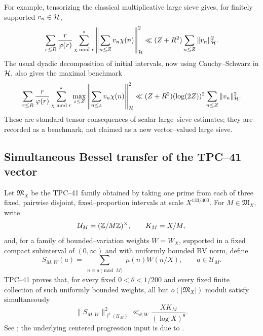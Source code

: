 For example, tensorizing the classical multiplicative large sieve
\citep{MontgomeryVaughan1973} gives, for finitely supported
\(v_n\in\mathcal H\),
\begin{equation}
 \sum_{r\le R}\frac r{\varphi(r)}
 \sum_{\chi\bmod r}^{*}
 \left\|\sum_{n\le Z}v_n\chi(n)\right\|_{\mathcal H}^{2}
 \ll (Z+R^2)\sum_{n\le Z}\|v_n\|_{\mathcal H}^{2}.
 \label{eq:tpc42-hilbert-multiplicative-large-sieve}
\end{equation}
The usual dyadic decomposition of initial intervals, now using
Cauchy--Schwarz in \(\mathcal H\), also gives the maximal benchmark
\begin{equation}
 \sum_{r\le R}\frac r{\varphi(r)}
 \sum_{\chi\bmod r}^{*}
 \max_{z\le Z}
 \left\|\sum_{n\le z}v_n\chi(n)\right\|_{\mathcal H}^{2}
 \ll (Z+R^2)(\log(2Z))^2
 \sum_{n\le Z}\|v_n\|_{\mathcal H}^{2}.
 \label{eq:tpc42-hilbert-maximal-large-sieve}
\end{equation}
These are standard tensor consequences of scalar large--sieve estimates;
they are recorded as a benchmark, not claimed as a new vector--valued
large sieve.

\subsection{Simultaneous Bessel transfer of the TPC--41 vector}

Let \(\mathfrak M_X\) be the TPC--41 family obtained by taking one prime
from each of three fixed, pairwise disjoint, fixed--proportion intervals
at scale \(X^{133/400}\).  For \(M\in\mathfrak M_X\), write
\begin{equation}
 \mathcal U_M=(\mathbb Z/M\mathbb Z)^{\times},
 \qquad K_M=X/M,
 \label{eq:tpc42-reduced-residue-space}
\end{equation}
and, for a family of bounded--variation weights \(W=W_X\), supported in
a fixed compact subinterval of \((0,\infty)\) and with uniformly bounded
BV norm, define
\begin{equation}
 S_{M,W}(a)
 =\sum_{\substack{n\equiv a\pmod M}}
   \mu(n)W(n/X),
 \qquad a\in\mathcal U_M.
 \label{eq:tpc42-scalar-residue-vector}
\end{equation}
TPC--41 proves that, for every fixed \(0<\theta<1/200\) and every fixed
finite collection of such uniformly bounded weights, all but
\(o(|\mathfrak M_X|)\) moduli satisfy simultaneously
\begin{equation}
 \|S_{M,W}\|_{\ell^2(\mathcal U_M)}^2
 \ll_{\theta,W}\frac{XK_M}{(\log X)^\theta}.
 \label{eq:tpc42-inherited-scalar-residue-bound}
\end{equation}
See \citet{WangTPC41}; the underlying centered progression input is due
to \citet{KlurmanMangerelTeravainen2023}.

